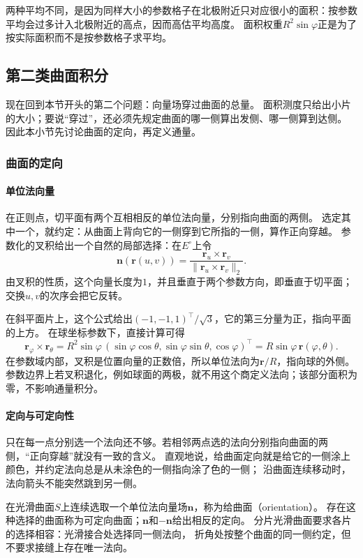 两种平均不同，是因为同样大小的参数格子在北极附近只对应很小的面积：按参数平均会过多计入北极附近的高点，因而高估平均高度。
面积权重$R^2\sin\varphi$正是为了按实际面积而不是按参数格子求平均。

\subsection{第二类曲面积分}

现在回到本节开头的第二个问题：向量场穿过曲面的总量。
面积测度只给出小片的大小；要说“穿过”，还必须先规定曲面的哪一侧算出发侧、哪一侧算到达侧。
因此本小节先讨论曲面的定向，再定义通量。

\subsubsection{曲面的定向}

\paragraph{单位法向量}

在正则点，切平面有两个互相相反的单位法向量，分别指向曲面的两侧。
选定其中一个，就约定：从曲面上背向它的一侧穿到它所指的一侧，算作正向穿越。
参数化的叉积给出一个自然的局部选择：在$E^\circ$上令
\[
 \bm n(\bm r(u,v))
 =\frac{\bm r_u\times\bm r_v}{\lVert\bm r_u\times\bm r_v\rVert_2}.
\]
由叉积的性质，这个向量长度为$1$，并且垂直于两个参数方向，即垂直于切平面；交换$u,v$的次序会把它反转。

在斜平面片上，这个公式给出$(-1,-1,1)^\top/\sqrt3$，它的第三分量为正，指向平面的上方。
在球坐标参数下，直接计算可得
\[
 \bm r_\varphi\times\bm r_\theta
 =R^2\sin\varphi\,(\sin\varphi\cos\theta,\sin\varphi\sin\theta,\cos\varphi)^\top
 =R\sin\varphi\,\bm r(\varphi,\theta).
\]
在参数域内部，叉积是位置向量的正数倍，所以单位法向为$\bm r/R$，指向球的外侧。
参数边界上若叉积退化，例如球面的两极，就不用这个商定义法向；该部分面积为零，不影响通量积分。

\paragraph{定向与可定向性}

只在每一点分别选一个法向还不够。若相邻两点选的法向分别指向曲面的两侧，“正向穿越”就没有一致的含义。
直观地说，给曲面定向就是给它的一侧涂上颜色，并约定法向总是从未涂色的一侧指向涂了色的一侧；
沿曲面连续移动时，法向箭头不能突然跳到另一侧。

\begin{definition}[曲面的定向]
\label{def:analysis-surface-orientation}
在光滑曲面$S$上连续选取一个单位法向量场$\bm n$，称为给曲面（orientation）。
存在这种选择的曲面称为可定向曲面；$\bm n$和$-\bm n$给出相反的定向。
分片光滑曲面要求各片的选择相容：光滑接合处选择同一侧法向，
折角处按整个曲面的同一侧约定，但不要求接缝上存在唯一法向。
\end{definition}

